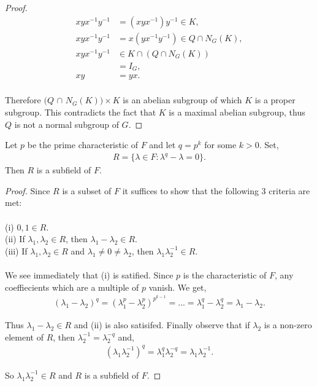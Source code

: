 \begin{proof}
\begin{align*} xyx^{-1}y^{-1} &=  (xyx^{-1})y^{-1} \in K, \tag{since $K \vartriangleleft N_G(K)$} \\
xyx^{-1}y^{-1} &= x(yx^{-1}y^{-1}) \in Q \cap N_G(K), \tag{since $Q \cap N_G(K) \vartriangleleft N_G(K)$} \\
xyx^{-1}y^{-1} &\in K \cap ( Q \cap N_G(K)) \\
&= I_G, \tag{since gcd$(|Q \cap N_G(K)|,|K|) = 1$} \\
xy &= yx. \\
\end{align*}

Therefore $(Q$ $\cap$ $N_G(K)) \times K$ is an abelian subgroup of which $K$ is a proper subgroup. This contradicts the fact that $K$ is a maximal abelian subgroup, thus $Q$ is not a normal subgroup of $G$.

\end{proof}

\begin{lemma}\label{subfield} Let $p$ be the prime characteristic of $F$ and let $q= p^k$ for some $k>0$. Set,
\begin{align}\label{RRR} R = \{ \lambda \in F : \lambda^q -\lambda = 0 \}.
\end{align}
Then $R$ is a subfield of $F$.
\end{lemma}

\begin{proof} Since $R$ is a subset of $F$ it suffices to show that the following 3 criteria are met: \\
\\
(i) $0, 1 \in R$. \\
(ii) If $\lambda_1, \lambda_2 \in R$, then $\lambda_1 - \lambda_2 \in R$. \\
(iii) If $\lambda_1, \lambda_2 \in R$ and $\lambda_1 \neq 0 \neq \lambda_2$, then $\lambda_1 \lambda^{-1}_2 \in R$. \\
\\
We see immediately that (i) is satified. Since $p$ is the characteristic of $F$, any coeffiecients which are a multiple of $p$ vanish. We get,
\begin{align*} (\lambda_1 - \lambda_2)^q = (\lambda^p_1 - \lambda^p_2)^{p^{k-1}} = ... = \lambda^q_1 - \lambda^q_2 = \lambda_1 - \lambda_2.
\end{align*}

Thus $\lambda_1 - \lambda_2 \in R$ and (ii) is also satisifed. Finally observe that if $\lambda_2$ is a non-zero element of $R$, then $\lambda^{-1}_2 = \lambda^{-q}_2$ and,
\begin{align*} (\lambda_1 \lambda^{-1}_2)^q = \lambda^q_1 \lambda^{-q}_2 = \lambda_1 \lambda^{-1}_2.
\end{align*}

So $\lambda_1 \lambda^{-1}_2 \in R$ and $R$ is a subfield of $F$.

\end{proof}

